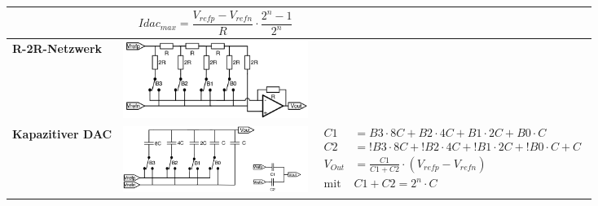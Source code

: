 \begin{longtable}{|>{\bfseries}p{3cm}|c|p{8.6cm}|}
	& \[
		Idac_{max}=\frac{V_{refp}-V_{refn}}{R} \cdot \frac{2^n-1}{2^n}
	  \]
	\\ \hline
	R-2R-Netzwerk \hartl{462}
	& \includegraphics[width=6cm, valign=t]{./pictures/r2rnetzwerk.png}
	&
	\\ \hline
	Kapazitiver DAC
	& \includegraphics[width=6cm, valign=t]{./pictures/kapazitiverDAC.png}
	& {\begin{align*}
		C1	&= B3 \cdot 8C+B2 \cdot 4C+ B1 \cdot 2C+B0 \cdot C \\
		C2	&= !B3 \cdot 8C+!B2 \cdot 4C+ !B1 \cdot 2C+!B0 \cdot C+C \\
		V_{Out}& =\frac{C1}{C1+C2}\cdot (V_{refp}-V_{refn})\\
		\text{mit } & C1+C2=2^n\cdot C
	  \end{align*}}
	\\ \hline
\end{longtable}


